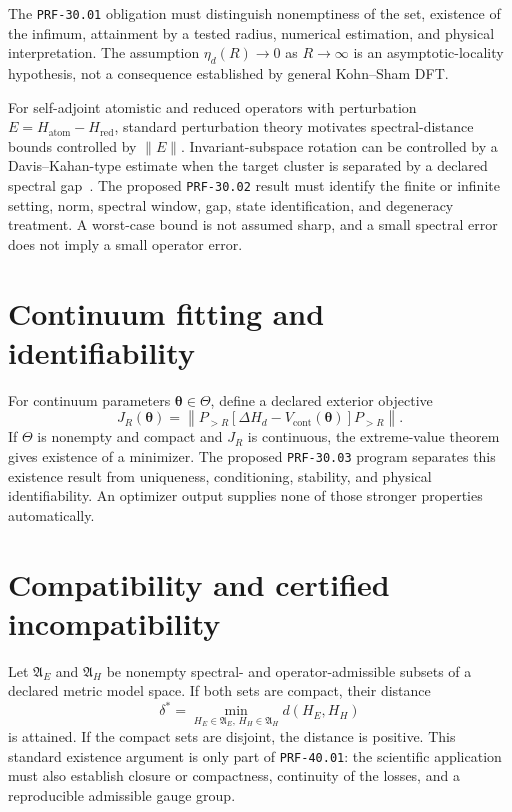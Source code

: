 The \texttt{PRF-30.01} obligation must distinguish nonemptiness of the set,
existence of the infimum, attainment by a tested radius, numerical estimation,
and physical interpretation. The assumption
$\eta_d(R)\to0$ as $R\to\infty$ is an asymptotic-locality hypothesis, not a
consequence established by general Kohn--Sham DFT.

For self-adjoint atomistic and reduced operators with perturbation
$E=H_{\mathrm{atom}}-H_{\mathrm{red}}$, standard perturbation theory motivates
spectral-distance bounds controlled by $\|E\|$. Invariant-subspace rotation can
be controlled by a Davis--Kahan-type estimate when the target cluster is
separated by a declared spectral gap~\cite{davis1970}. The proposed
\texttt{PRF-30.02} result must identify the finite or infinite setting, norm,
spectral window, gap, state identification, and degeneracy treatment. A
worst-case bound is not assumed sharp, and a small spectral error does not imply
a small operator error.

\section{Continuum fitting and identifiability}

For continuum parameters $\boldsymbol\theta\in\Theta$, define a declared
exterior objective
\begin{equation}
  J_R(\boldsymbol\theta)
  =
  \left\|
    P_{>R}
    [\Delta H_d-V_{\mathrm{cont}}(\boldsymbol\theta)]
    P_{>R}
  \right\|.
\end{equation}
If $\Theta$ is nonempty and compact and $J_R$ is continuous, the extreme-value
theorem gives existence of a minimizer. The proposed \texttt{PRF-30.03}
program separates this existence result from uniqueness, conditioning,
stability, and physical identifiability. An optimizer output supplies none of
those stronger properties automatically.

\section{Compatibility and certified incompatibility}

Let $\mathfrak A_E$ and $\mathfrak A_H$ be nonempty spectral- and
operator-admissible subsets of a declared metric model space. If both sets are
compact, their distance
\begin{equation}
  \delta^{\ast}
  =
  \min_{H_E\in\mathfrak A_E,\,H_H\in\mathfrak A_H}
  d(H_E,H_H)
\end{equation}
is attained. If the compact sets are disjoint, the distance is positive. This
standard existence argument is only part of \texttt{PRF-40.01}: the scientific
application must also establish closure or compactness, continuity of the
losses, and a reproducible admissible gauge group.

